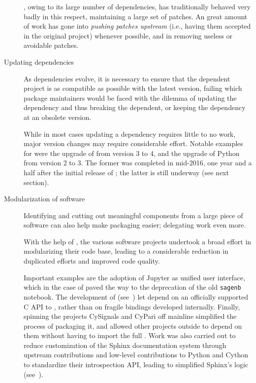 \documentclass{deliverablereport}
\begin{document}
\begin{description}
  \Sage, owing to its large number of dependencies, has traditionally
  behaved very badly in this respect, maintaining a large set of
  patches. %
  An great amount of work has gone into \emph{pushing patches
    upstream} (i.e., having them accepted in the original project)
  whenever possible, and in removing useless or avoidable patches.
  
\item[Updating dependencies] As dependencies evolve, it is necessary
  to ensure that the dependent project is as compatible as possible
  with the latest version,
  failing which package maintainers would be faced with the dilemma
  of updating the dependency and thus breaking the dependent, or
  keeping the dependency at an obsolete version.

  While in most cases updating a dependency requires little to no
  work, major version changes may require considerable effort. %
  Notable examples for \Sage were the upgrade of \Singular from
  version 3 to 4, and the upgrade of Python from version 2 to 3. %
  The former was completed in mid-2016, one year and a half after the
  initial release of ; the latter is still underway (see
  next section).
  
\item[Modularization of \ODK software] Identifying and cutting out
  meaningful components from a large piece of software can also help
  make packaging easier; delegating work even more.

  With the help of \ODK, the various software projects undertook a
  broad effort in modularizing their code base, leading to a
  considerable reduction in duplicated efforts and improved code
  quality. %

  Important examples are the adoption of Jupyter as unified user
  interface, which in the case of \Sage paved the way to the
  deprecation of the old \texttt{sagenb} notebook. %
  The development of \libGAP (see~) let
  \Sage depend on an officially supported C API to \GAP, rather than
  on fragile bindings developed internally. %
  Finally, spinning the projects CySignals and CyPari off mainline
  \Sage simplified the process of packaging it, and allowed other
  projects outside \ODK to depend on them without having to import the
  full \Sage. Work was also carried out to reduce customization
  of the Sphinx documentation system through upstream contributions
  and low-level contributions to Python and Cython to standardize
  their introspection API, leading to simplified Sphinx's logic
  (see~).


\end{description}
\end{document}
